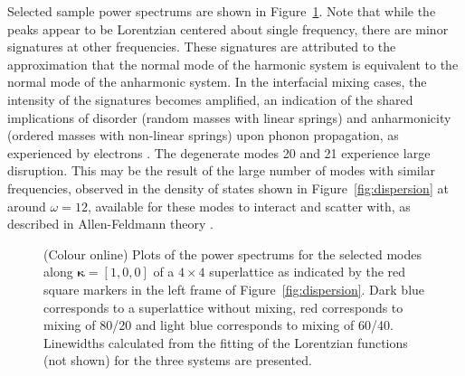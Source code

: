 \documentclass[aps,prb,preprint,preprintnumbers,amsmath,amssymb,floatfix,superscriptaddress]{revtex4}
\begin{document}
Selected sample power spectrums are shown in Figure~\ref{fig:sed}. Note that while the peaks appear to be Lorentzian centered about single frequency, there are minor signatures at other frequencies. These signatures are attributed to the approximation that the normal mode of the harmonic system is equivalent to the normal mode of the anharmonic system. In the interfacial mixing cases, the intensity of the signatures becomes amplified, an indication of the shared implications of disorder (random masses with linear springs) and anharmonicity (ordered masses with non-linear springs) \cite{RevModPhys.53.175} upon phonon propagation, as experienced by electrons \cite{mott1961theory}. The degenerate modes 20 and 21 experience large disruption. This may be the result of the large number of modes with similar frequencies, observed in the density of states shown in Figure~\ref{fig:dispersion} at around $\omega=12$, available for these modes to interact and scatter with, as described in Allen-Feldmann theory \cite{allen_thermal_1993,feldman_thermal_1993-1}.
\begin{figure}[!h]
\begin{center}
\renewcommand{\figure}{Fig.}
\caption{(Colour online) Plots of the power spectrums for the selected modes along $\pmb{\kappa}=[1,0,0]$ of a $4\times4$ superlattice as indicated by the red square markers in the left frame of Figure~\ref{fig:dispersion}. Dark blue corresponds to a superlattice without mixing, red corresponds to mixing of 80/20 and light blue corresponds to mixing of 60/40. Linewidths calculated from the fitting of the Lorentzian functions (not shown) for the three systems are presented.}
\label{fig:sed}
\end{center}
\end{figure}
\end{document}
